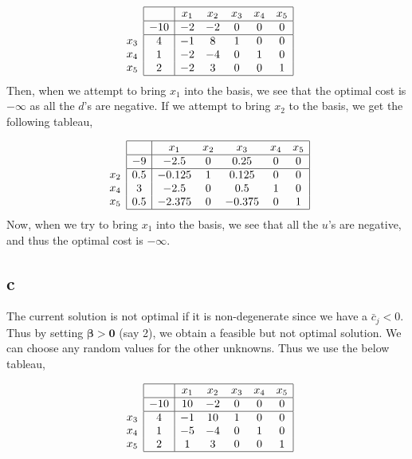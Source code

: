 $$
\begin{array}{c}
\\
 \\
x_3 \\
x_4 \\ 
x_5 \\
\end{array}
\begin{array}{|c|ccccc|}
    \hline
    & x_1 & x_2 & x_3 & x_4 & x_5\\ \hline
  -10 & -2 & -2 & 0 & 0 & 0\\ \hline
  4 & -1 & 8 & 1 & 0 & 0\\
  1 & -2 & -4 & 0 & 1 & 0\\
  2 & -2 & 3 & 0 & 0 & 1\\\hline
\end{array}
$$
Then, when we attempt to bring $x_1$ into the basis, we see that the optimal cost is $- \infty$ as all the $d$'s are negative. If we attempt to bring $x_2$ to the basis, we get the following tableau,

$$
\begin{array}{c}
\\
 \\
x_2 \\
x_4 \\ 
x_5 \\
\end{array}
\begin{array}{|c|ccccc|}
    \hline
    & x_1 & x_2 & x_3 & x_4 & x_5\\ \hline
  -9 & -2.5 & 0 & 0.25 & 0 & 0\\ \hline
  0.5 & -0.125 & 1 & 0.125& 0 & 0\\
  3 & -2.5 & 0 & 0.5 & 1 & 0\\
  0.5 & -2.375 & 0 & -0.375 & 0 & 1\\\hline
\end{array}
$$
Now, when we try to bring $x_1$ into the basis, we see that all the $u$'s are negative, and thus the optimal cost is $- \infty$.

\subsection*{c}
The current solution is not optimal if it is non-degenerate since we have a $\bar{c}_j < 0$. Thus by setting $\boldsymbol{\beta > 0}$ (say 2), we obtain a feasible but not optimal solution. We can choose any random values for the other unknowns. Thus we use the below tableau,


$$
\begin{array}{c}
\\
 \\
x_3 \\
x_4 \\ 
x_5 \\
\end{array}
\begin{array}{|c|ccccc|}
    \hline
    & x_1 & x_2 & x_3 & x_4 & x_5\\ \hline
  -10 & 10 & -2 & 0 & 0 & 0\\ \hline
  4 & -1 & 10 & 1 & 0 & 0\\
  1 & -5 & -4 & 0 & 1 & 0\\
  2 & 1 & 3 & 0 & 0 & 1\\\hline
\end{array}
$$
